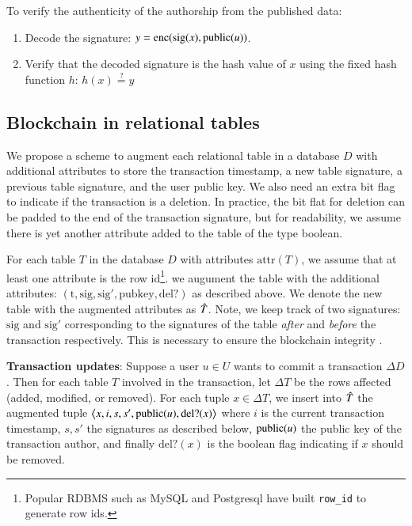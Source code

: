 To verify the authenticity of the authorship from the published data:

\begin{enumerate}
    \item Decode the signature:
        $y = \operatorname{enc}(\mathrm{sig}(x), \operatorname{public}(u))$.
    \item Verify that the decoded signature is the hash value of $x$ using the
        fixed hash function $h$:
        $ h(x) \overset{?}{=} y $
\end{enumerate}

\subsection{Blockchain in relational tables}

We propose a scheme to augment each relational table in a database $D$ with
additional attributes to store the transaction timestamp, a new table signature,
a previous table signature,
and the user public key.  We also need an extra bit flag to indicate if the
transaction is a deletion.  In practice, the bit flat for deletion can be padded
to the end of the transaction signature, but for readability, we assume there is
yet another attribute added to the table of the type boolean.

\newcommand{\attr}{\mathrm{attr}}
For each table $T$ in the database $D$ with attributes $\attr(T)$, we assume
that at least one attribute is the row id\footnote{Popular RDBMS such as MySQL
and Postgresql have built {\tt row\_id} to generate row ids.}.
we augument
the table with the additional attributes: $(\mathrm{t}, \mathrm{sig},
\mathrm{sig}', \mathrm{pubkey}, \mathrm{del?})$ as described above.  We denote
the new table with the augmented attributes as $\Hat T$.
Note, we keep track of two signatures: $\mathrm{sig}$ and $\mathrm{sig}'$
corresponding to the signatures of the table {\em after} and {\em before}
the transaction respectively.  This is necessary to ensure the blockchain
integrity \cite{dhillon2017blockchain,wang2018ablockchain}.

\medskip

{\bf Transaction updates}:  \quad Suppose a user $u\in U$ wants to commit a
transaction $\Delta D$.  Then for each table $T$ involved in the transaction,
let $\Delta T$ be the rows affected (added, modified, or removed).  For each
tuple $x\in\Delta T$, we insert into $\Hat T$ the augmented tuple
$\left<x, i, s, s', \operatorname{public}(u), \mathrm{del?}(x)\right>$ where
$i$ is the current transaction timestamp, $s, s'$ the signatures as
described below, $\operatorname{public}(u)$ the public key of the transaction author, and
finally $\mathrm{del?}(x)$ is the boolean flag indicating if $x$ should be
removed.

